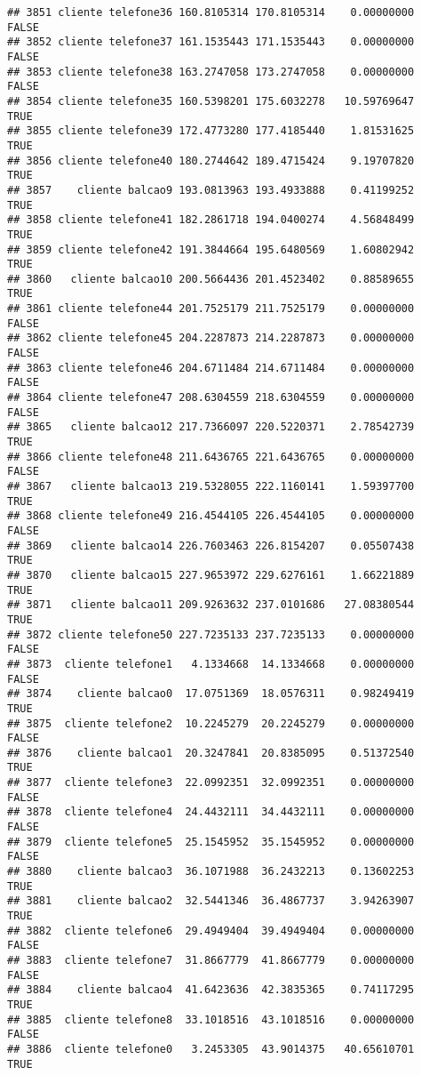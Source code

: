 \documentclass[
]{article}
\begin{document}
\begin{verbatim}
## 3851 cliente telefone36 160.8105314 170.8105314    0.00000000    FALSE
## 3852 cliente telefone37 161.1535443 171.1535443    0.00000000    FALSE
## 3853 cliente telefone38 163.2747058 173.2747058    0.00000000    FALSE
## 3854 cliente telefone35 160.5398201 175.6032278   10.59769647     TRUE
## 3855 cliente telefone39 172.4773280 177.4185440    1.81531625     TRUE
## 3856 cliente telefone40 180.2744642 189.4715424    9.19707820     TRUE
## 3857    cliente balcao9 193.0813963 193.4933888    0.41199252     TRUE
## 3858 cliente telefone41 182.2861718 194.0400274    4.56848499     TRUE
## 3859 cliente telefone42 191.3844664 195.6480569    1.60802942     TRUE
## 3860   cliente balcao10 200.5664436 201.4523402    0.88589655     TRUE
## 3861 cliente telefone44 201.7525179 211.7525179    0.00000000    FALSE
## 3862 cliente telefone45 204.2287873 214.2287873    0.00000000    FALSE
## 3863 cliente telefone46 204.6711484 214.6711484    0.00000000    FALSE
## 3864 cliente telefone47 208.6304559 218.6304559    0.00000000    FALSE
## 3865   cliente balcao12 217.7366097 220.5220371    2.78542739     TRUE
## 3866 cliente telefone48 211.6436765 221.6436765    0.00000000    FALSE
## 3867   cliente balcao13 219.5328055 222.1160141    1.59397700     TRUE
## 3868 cliente telefone49 216.4544105 226.4544105    0.00000000    FALSE
## 3869   cliente balcao14 226.7603463 226.8154207    0.05507438     TRUE
## 3870   cliente balcao15 227.9653972 229.6276161    1.66221889     TRUE
## 3871   cliente balcao11 209.9263632 237.0101686   27.08380544     TRUE
## 3872 cliente telefone50 227.7235133 237.7235133    0.00000000    FALSE
## 3873  cliente telefone1   4.1334668  14.1334668    0.00000000    FALSE
## 3874    cliente balcao0  17.0751369  18.0576311    0.98249419     TRUE
## 3875  cliente telefone2  10.2245279  20.2245279    0.00000000    FALSE
## 3876    cliente balcao1  20.3247841  20.8385095    0.51372540     TRUE
## 3877  cliente telefone3  22.0992351  32.0992351    0.00000000    FALSE
## 3878  cliente telefone4  24.4432111  34.4432111    0.00000000    FALSE
## 3879  cliente telefone5  25.1545952  35.1545952    0.00000000    FALSE
## 3880    cliente balcao3  36.1071988  36.2432213    0.13602253     TRUE
## 3881    cliente balcao2  32.5441346  36.4867737    3.94263907     TRUE
## 3882  cliente telefone6  29.4949404  39.4949404    0.00000000    FALSE
## 3883  cliente telefone7  31.8667779  41.8667779    0.00000000    FALSE
## 3884    cliente balcao4  41.6423636  42.3835365    0.74117295     TRUE
## 3885  cliente telefone8  33.1018516  43.1018516    0.00000000    FALSE
## 3886  cliente telefone0   3.2453305  43.9014375   40.65610701     TRUE

\end{verbatim}
\end{document}
